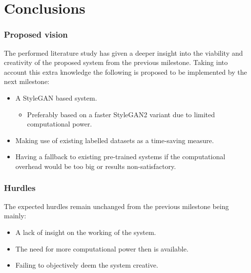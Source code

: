 \part{Conclusions}
\label{part:conclusions}

\section{Proposed vision}
\label{sec:proposal}

The performed literature study has given a deeper insight into the viability and creativity of the proposed system from the previous milestone.
Taking into account this extra knowledge the following is proposed to be implemented by the next milestone:
\begin{itemize}
    \item A StyleGAN based system.
    \begin{itemize}
        \item Preferably based on a faster StyleGAN2 variant due to limited computational power.
    \end{itemize}
    \item Making use of existing labelled datasets as a time-saving measure.
    \item Having a fallback to existing pre-trained systems if the computational overhead would be too big or results non-satisfactory. 
\end{itemize}

\section{Hurdles}
\label{sec:hurdles}

The expected hurdles remain unchanged from the previous milestone being mainly:
\begin{itemize}
    \item A lack of insight on the working of the system.
    \item The need for more computational power then is available.
    \item Failing to objectively deem the system creative.
\end{itemize}